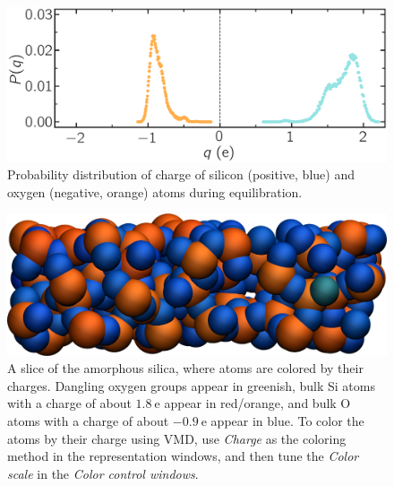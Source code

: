 \documentclass[9pt,tutorial]{livecoms}
\begin{document}
\begin{figure}
\includegraphics[width=\linewidth]{SIO-distribution}
\caption{Probability distribution of charge of silicon (positive, blue) and oxygen
(negative, orange) atoms during equilibration.}
\label{fig:SIO-distribution}
\end{figure}

\begin{figure}
\includegraphics[width=\linewidth]{SIO-slice}
\caption{A slice of the amorphous silica, where atoms are colored by their charges.
Dangling oxygen groups appear in greenish, bulk Si atoms with a charge of about
$1.8~\text{e}$  appear in red/orange, and bulk O atoms with a charge of about
$-0.9~\text{e}$ appear in blue. To color the atoms by their charge using VMD,
use \textit{Charge} as the coloring method in the representation windows, and
then tune the \textit{Color scale} in the \textit{Color control windows}.}
\label{fig:SIO-slice}
\end{figure}
\end{document}

